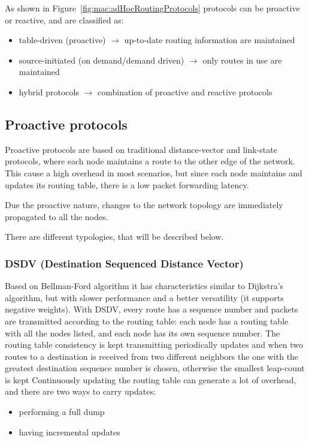 As shown in Figure~\ref{fig:mac:adHocRoutingProtocols} protocols can be
proactive or reactive, and are classified as:
\begin{itemize}
\item table-driven (proactive) $\to$ up-to-date routing information are
  maintained
\item source-initiated (on demand/demand driven) $\to$ only routes in use are
  maintained
\item hybrid protocols $\to$ combination of proactive and reactive protocols
\end{itemize}

\subsection{Proactive protocols}

Proactive protocols are based on traditional distance-vector and link-state
protocols, where each node maintains a route to the other edge of the network.
This cause a high overhead in most scenarios, but since each node maintains and
updates its routing table, there is a low packet forwarding latency.

Due the proactive nature, changes to the network topology are immediately
propagated to all the nodes.

There are different typologies, that will be described below.

\subsubsection{DSDV (Destination Sequenced Distance Vector)}

Based on Bellman-Ford algorithm it has characteristics similar to Dijkstra's
algorithm, but with slower performance and a better versatility (it supports
negative weights). With DSDV, every route has a sequence number and packets are
transmitted according to the routing table: each node has a routing table with
all the nodes listed, and each node has its own sequence number.
The routing table consistency is kept transmitting periodically updates and when
two routes to a destination is received from two different neighbors the one
with the greatest destination sequence number is chosen, otherwise the smallest
leap-count is kept %
Continuously updating the routing table can generate a lot of overhead, and
there are two ways to carry updates:
\begin{itemize}
\item performing a full dump
\item having incremental updates
\end{itemize}

